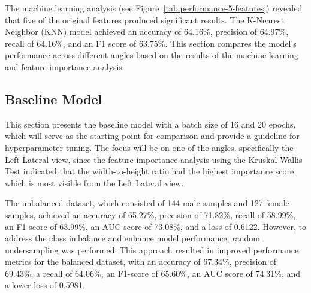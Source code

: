 The machine learning analysis (see Figure~\ref{tab:performance-5-features}) revealed that five of the original features produced significant results. The K-Nearest Neighbor (KNN) model achieved an accuracy of 64.16\%, precision of 64.97\%, recall of 64.16\%, and an F1 score of 63.75\%. This section compares the model's performance across different angles based on the results of the machine learning and feature importance analysis.

\subsection{Baseline Model}
This section presents the baseline model with a batch size of 16 and 20 epochs, which will serve as the starting point for comparison and provide a guideline for hyperparameter tuning. The focus will be on one of the angles, specifically the Left Lateral view, since the feature importance analysis using the Kruskal-Wallis Test indicated that the width-to-height ratio had the highest importance score, which is most visible from the Left Lateral view.

\vspace{0.5cm}
\begin{table}[H]
	\centering
	\caption{Performance metrics for unbalanced vs. balanced datasets (Batch Size: 16, Epochs: 20).}
	\label{tab:unbalanced-balanced}
\end{table}

The unbalanced dataset, which consisted of 144 male samples and 127 female samples, achieved an accuracy of 65.27\%, precision of 71.82\%, recall of 58.99\%, an F1-score of 63.99\%, an AUC score of 73.08\%, and a loss of 0.6122. However, to address the class imbalance and enhance model performance, random undersampling was performed. This approach resulted in improved performance metrics for the balanced dataset, with an accuracy of 67.34\%, precision of 69.43\%, a recall of 64.06\%, an F1-score of 65.60\%, an AUC score of 74.31\%, and a lower loss of 0.5981.

